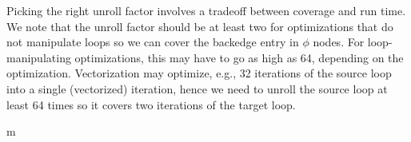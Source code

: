 Picking the right unroll factor involves a tradeoff between coverage
and run time. We note that the unroll factor should be at least two
for optimizations that do not manipulate loops so we can cover the
backedge entry in $\phi$ nodes. For loop-manipulating optimizations,
this may have to go as high as 64, depending on the optimization.
Vectorization may optimize, e.g., 32 iterations of the source loop
into a single (vectorized) iteration, hence we need to unroll the
source loop at least 64 times so it covers two iterations of the
target loop.

m